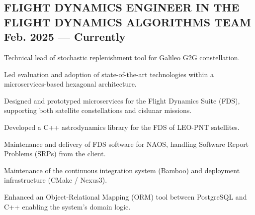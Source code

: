\documentclass[letter,10pt]{article}
\begin{document}
\subsection{{FLIGHT DYNAMICS ENGINEER IN THE FLIGHT DYNAMICS ALGORITHMS TEAM \hfill Feb. 2025  --- Currently}}
\begin{zitemize}
\item Technical lead of stochastic replenishment tool for Galileo G2G constellation.
\item Led evaluation and adoption of state-of-the-art technologies within a microservices-based hexagonal architecture.
\item Designed and prototyped microservices for the Flight Dynamics Suite (FDS), supporting both satellite constellations and cislunar missions.
\item Developed a C++ astrodynamics library for the FDS of LEO-PNT satellites.
\item Maintenance and delivery of FDS software for NAOS, handling Software Report Problems (SRPs) from the client.
\item Maintenance of the continuous integration system (Bamboo) and deployment infrastructure (CMake / Nexus3).
\item Enhanced an Object-Relational Mapping (ORM) tool between PostgreSQL and C++ enabling the system's domain logic.\end{zitemize}
\end{document}
